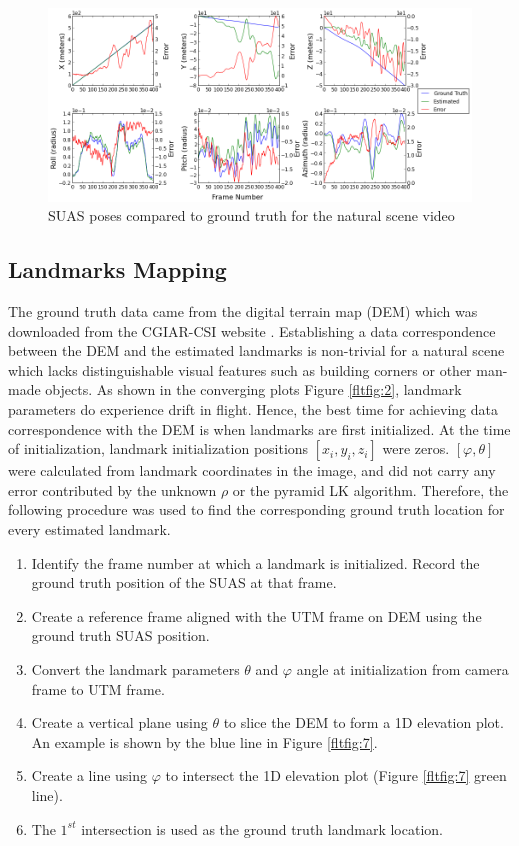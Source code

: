 \begin{figure}[h]
\centering
\includegraphics[width=15.5cm, keepaspectratio=true]
{./Figures/fltfig/cut1/Figure30.png}
\caption{SUAS poses compared to ground truth for the natural scene video}
\label{fltfig:6}
\end{figure}
\FloatBarrier

\subsection{Landmarks Mapping}\label{sec:accuracy_features}

The ground truth data came from the digital terrain map (DEM) which
was downloaded from the CGIAR-CSI website \cite{_cgiar-csi_????}.
Establishing a data correspondence between the DEM and the estimated
landmarks is non-trivial for a natural scene which lacks
distinguishable visual features such as building corners or other
man-made objects. As shown in the converging plots Figure
\ref{fltfig:2}, landmark parameters do experience drift in flight.
Hence, the best time for achieving data correspondence with the DEM is
when landmarks are first initialized. At the time of initialization,
landmark initialization positions $[x_i, y_i, z_i]$ were zeros.
$[\varphi, \theta]$ were calculated from landmark coordinates in the
image, and did not carry any error contributed by the unknown $\rho$
or the pyramid LK algorithm. Therefore, the following procedure was
used to find the corresponding ground truth location for every
estimated landmark.

\begin{enumerate}
  \item Identify the frame number at which a landmark is initialized.
  Record the ground truth position of the SUAS at that frame.
  \item Create a reference frame aligned with the UTM frame on DEM
  using the ground truth SUAS position.
  \item Convert the landmark parameters $\theta$ and $\varphi$
  angle at initialization from camera frame to UTM frame. 
  \item Create a vertical plane using $\theta$ to slice the DEM to
  form a 1D elevation plot. An example is shown by the blue line in Figure
  \ref{fltfig:7}.
  \item Create a line using $\varphi$ to intersect the 1D elevation plot
  (Figure \ref{fltfig:7} green line). 
  \item The $1^{st}$ intersection is used as the ground truth landmark
  location.
\end{enumerate}

